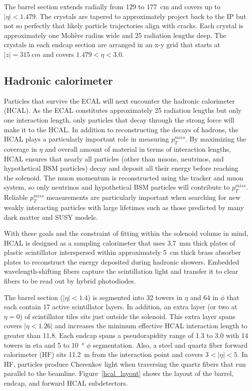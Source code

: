 

The barrel section extends radially from \num{129} to \SI{177}{cm} and covers up to $|\eta|<1.479$. The crystals are tapered to approximately project back to the IP but not so perfectly that likely particle trajectories align with cracks. Each crystal is approximately one Moli\`ere radius wide and 25 radiation lengths deep. The crystals in each endcap section are arranged in an x-y grid that starts at $\lvert z \rvert = \SI{315}{cm}$ and covers $1.479<\eta<3.0$.


\subsection{Hadronic calorimeter}
Particles that survive the ECAL will next encounter the hadronic calorimeter (HCAL). As the ECAL constitutes approximately 25 radiation lengths but only one interaction length, only particles that decay through the strong force will make it to the HCAL. In addition to reconstructing the decays of hadrons, the HCAL plays a particularly important role in measuring $p_{T}^{miss}$. By maximizing the coverage in $\eta$ and overall amount of material in terms of interaction lengths, HCAL ensures that nearly all particles (other than muons, neutrinos, and hypothetical BSM particles) decay and deposit all their energy before reaching the solenoid. The muon momentum is reconstructed using the tracker and muon system, so only neutrinos and hypothetical BSM particles will contribute to $p_{T}^{miss}$. Reliable $p_{T}^{miss}$ measurements are particularly important when searching for new weakly interacting particles with large lifetimes such as those predicted by many dark matter and SUSY models.

With these goals and the constraint of fitting within the solenoid volume in mind, HCAL is designed as a sampling calorimeter that uses \SI{3.7}{\milli\metre} thick plates of plastic scintillator interspersed within approximately \SI{5}{\cm} thick brass absorber plates to reconstruct the energy deposited during hadronic showers. Embedded wavelength-shifting fibers capture the scintillation light and transfer it to clear fibers to be read out by hybrid photodiodes.

The barrel section ($|\eta|<1.4$) is segmented into \num{32} towers in $\eta$ and \num{64} in $\phi$ that each contain 17 active scintillator layers. In addition, an extra layer (or two at $\eta = \num{0}$) of scintillator tiles sits just outside the solenoid. This extra layer spans covers $|\eta<1.26|$ and increases the minimum effective HCAL interaction length to greater than \num{11.8}. Each endcap spans a pseudorapidity range of \num{1.3} to \num{3.0} with \num{14} towers in eta and \num{5} to \SI{10}{\degree} $\phi$ segmentation. Also, a steel and quartz fiber forward calorimeter (HF) sits \SI{11.2}{m} from the interaction point and covers $3<|\eta|<5$. In HF, particles produce Cherenkov light when traversing the quartz fibers that run parallel to the beamline. Figure~\ref{hcal_layout} shows the layout of the barrel, endcap, and forward HCAL subdetectors.

